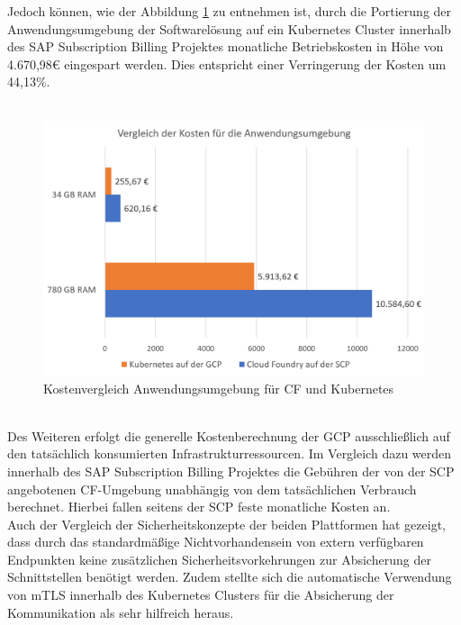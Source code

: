 \newpage
Jedoch können, wie der Abbildung \ref{grafik_kostenvergleich} zu entnehmen ist, durch die Portierung der Anwendungsumgebung der Softwarelösung auf ein Kubernetes Cluster innerhalb des SAP Subscription Billing Projektes monatliche Betriebskosten in Höhe von 4.670,98\textrm{\euro} eingespart werden. Dies entspricht einer Verringerung der Kosten um 44,13\%.\\
\\
\begin{figure}[h]
	\begin{center}
		\includegraphics[width=14cm]{img/Kostenvergleich.png}
		\caption[Kostenvergleich Anwendungsumgebung für \acs{CF} und Kubernetes]{Kostenvergleich Anwendungsumgebung für \acl{CF} und Kubernetes}
		\label{grafik_kostenvergleich}
	\end{center}
\end{figure}
\\
Des Weiteren erfolgt die generelle Kostenberechnung der \ac{GCP} ausschließlich auf den tatsächlich konsumierten Infrastrukturressourcen. Im Vergleich dazu werden innerhalb des SAP Subscription Billing Projektes die Gebühren der von der \ac{SCP} angebotenen \ac{CF}-Umgebung unabhängig von dem tatsächlichen Verbrauch berechnet. Hierbei fallen seitens der \ac{SCP} feste monatliche Kosten an.\\
Auch der Vergleich der Sicherheitskonzepte der beiden Plattformen hat gezeigt, dass durch das standardmäßige Nichtvorhandensein von extern verfügbaren Endpunkten keine zusätzlichen Sicherheitsvorkehrungen zur Absicherung der Schnittstellen benötigt werden. Zudem stellte sich die automatische Verwendung von \ac{mTLS} innerhalb des Kubernetes Clusters für die Absicherung der Kommunikation als sehr hilfreich heraus.\\
